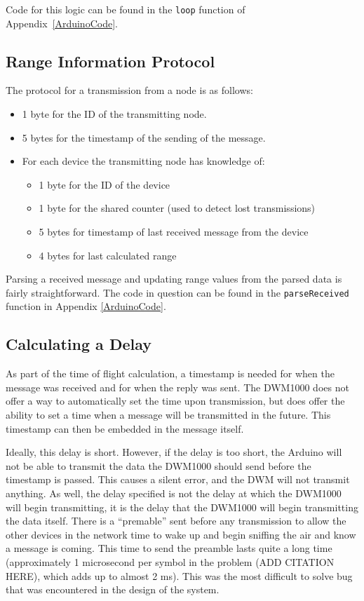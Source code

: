Code for this logic can be found in the \texttt{loop} function of Appendix~\ref{ArduinoCode}.

\subsection{Range Information Protocol}
The protocol for a transmission from a node is as follows:

\begin{itemize}
	\item 1 byte for the ID of the transmitting node.
	\item 5 bytes for the timestamp of the sending of the message.
	\item For each device the transmitting node has knowledge of:
	\begin{itemize}
		\item 1 byte for the ID of the device
		\item 1 byte for the shared counter (used to detect lost transmissions)
		\item 5 bytes for timestamp of last received message from the device
		\item 4 bytes for last calculated range	
	\end{itemize} 
\end{itemize}

Parsing a received message and updating range values from the parsed data is fairly straightforward. The code in question can be found in the \texttt{parseReceived} function in Appendix \ref{ArduinoCode}.

\subsection{Calculating a Delay}
\label{CalculatingADelay}
As part of the time of flight calculation, a timestamp is needed for when the message was received and for when the reply was sent. The DWM1000 does not offer a way to automatically set the time upon transmission, but does offer the ability to set a time when a message will be transmitted in the future. This timestamp can then be embedded in the message itself.

Ideally, this delay is short. However, if the delay is too short, the Arduino will not be able to transmit the data the DWM1000 should send before the timestamp is passed. This causes a silent error, and the DWM will not transmit anything. As well, the delay specified is not the delay at which the DWM1000 will begin transmitting, it is the delay that the DWM1000 will begin transmitting the data itself. There is a ``premable'' sent before any transmission to allow the other devices in the network time to wake up and begin sniffing the air and know a message is coming. This time to send the preamble lasts quite a long time (approximately 1 microsecond per symbol in the problem (ADD CITATION HERE), which adds up to almost 2 ms). This was the most difficult to solve bug that was encountered in the design of the system.

